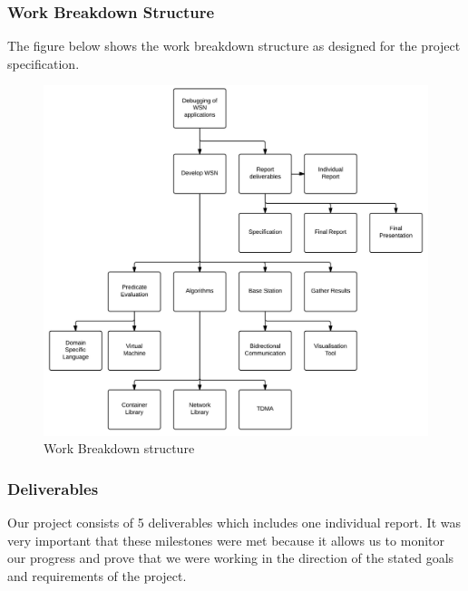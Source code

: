 \subsubsection{Work Breakdown Structure}

The figure below shows the work breakdown structure as designed for the project specification.

\begin{figure}[H]
\centering
\includegraphics[width=\linewidth]{Images/pm-wbs.pdf}
\caption{Work Breakdown structure}
\label{fig:Work Breakdown Structure}
\end{figure}

\subsubsection{Deliverables}

Our project consists of 5 deliverables which includes one individual report. It was very important that these milestones were met because it allows us to monitor our progress and prove that we were working in the direction of the stated goals and requirements of the project.

